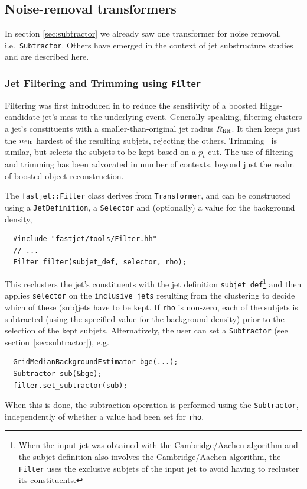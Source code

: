\documentclass[12pt,a4]{article}
\newcommand{\ttt}[1]{{\small\texttt{#1}}}
\begin{document}
\subsection{Noise-removal transformers}

In section \ref{sec:subtractor} we already saw one transformer for
noise removal, i.e.\ \ttt{Subtractor}. 
%
Others have emerged in the context of jet substructure studies and are
described here.
%

\subsubsection{Jet Filtering and Trimming using \texttt{Filter}}
\label{sec:filtering}

Filtering was first introduced in \cite{BDRS} to reduce the
sensitivity of a boosted Higgs-candidate jet's mass to the underlying
event.
%
Generally speaking, filtering clusters a jet's constituents with a
smaller-than-original jet radius $R_{\rm filt}$.
%
It then keeps just the $n_{\rm filt}$ hardest of the resulting
subjets, rejecting the others.
%
Trimming~\cite{trimming} is similar, but selects the subjets to be kept based on a
$p_t$ cut.
% 
The use of filtering and trimming has been advocated in number of
contexts, beyond just the realm of boosted object reconstruction.

The \ttt{fastjet::Filter} class derives from \ttt{Transformer}, and
can be constructed 
using a \ttt{JetDefinition}, a \ttt{Selector} and (optionally) a
value for the background density,
\begin{lstlisting}
  #include "fastjet/tools/Filter.hh"
  // ...
  Filter filter(subjet_def, selector, rho);
\end{lstlisting}
This reclusters the jet's constituents with the jet definition
\ttt{subjet\_def}\footnote{
%
When the input jet was obtained with the Cambridge/Aachen
algorithm and the subjet definition also involves the Cambridge/Aachen
algorithm, the \ttt{Filter} uses the exclusive subjets of the input
jet to avoid having to recluster its constituents.
} 
and then
applies \ttt{selector} on the \ttt{inclusive\_jets} resulting from the
clustering to decide which of these (sub)jets have to be kept.
%
If \ttt{rho} is non-zero, each of the subjets is subtracted
(using the specified value for the background density) prior to the
selection of the kept subjets. Alternatively, the user can set a
\ttt{Subtractor} (see section~\ref{sec:subtractor}), e.g.
\begin{lstlisting}
  GridMedianBackgroundEstimator bge(...);
  Subtractor sub(&bge);
  filter.set_subtractor(sub);
\end{lstlisting}
When this is done, the subtraction operation is performed using the
\ttt{Subtractor}, independently of whether a value had been set for
\ttt{rho}.
\end{document}
